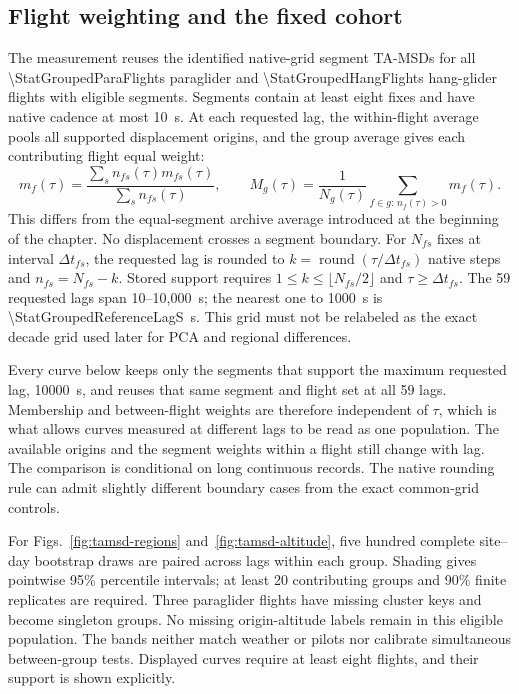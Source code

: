 \subsection{Flight weighting and the fixed cohort}

The measurement reuses the identified native-grid segment TA-MSDs for all
\num{\StatGroupedParaFlights} paraglider and \num{\StatGroupedHangFlights}
hang-glider flights with eligible segments. Segments contain at least eight fixes
and have native cadence at most \SI{10}{\second}. At each requested lag, the
within-flight average pools all supported displacement origins, and the group
average gives each contributing flight equal weight:
\begin{equation}
 m_f(\tau)=\frac{\sum_s n_{fs}(\tau)m_{fs}(\tau)}{\sum_s n_{fs}(\tau)},\qquad
 M_g(\tau)=\frac{1}{N_g(\tau)}\sum_{f\in g:\,n_f(\tau)>0}m_f(\tau).
 \label{eq:grouped-flight-tamsd}
\end{equation}
This differs from the equal-segment archive average introduced at the beginning
of the chapter. No displacement crosses a segment boundary. For $N_{fs}$ fixes
at interval $\Delta t_{fs}$, the requested lag is rounded to
$k=\operatorname{round}(\tau/\Delta t_{fs})$ native steps and
$n_{fs}=N_{fs}-k$. Stored support requires $1\le k\le\lfloor N_{fs}/2\rfloor$
and $\tau\ge\Delta t_{fs}$. The 59 requested lags span 10--10,000~s; the nearest
one to 1000~s is \SI{\StatGroupedReferenceLagS}{\second}. This grid must not be
relabeled as the exact decade grid used later for PCA and regional differences.

Every curve below keeps only the segments that support the maximum requested lag,
\SI{10000}{\second}, and reuses that same segment and flight set at all 59 lags.
Membership and between-flight weights are therefore independent of $\tau$, which is
what allows curves measured at different lags to be read as one population. The
available origins and the segment weights within a flight still change with lag.
The comparison is conditional on long continuous records. The native rounding rule
can admit slightly different boundary cases from the exact common-grid controls.

For Figs.~\ref{fig:tamsd-regions} and~\ref{fig:tamsd-altitude}, five hundred
complete site--day bootstrap draws are paired across lags within each group.
Shading gives pointwise 95\% percentile intervals; at least 20 contributing groups
and 90\% finite replicates are required. Three paraglider flights have missing cluster keys and
become singleton groups. No missing origin-altitude labels remain in this eligible
population. The bands neither match weather or pilots nor calibrate simultaneous
between-group tests. Displayed curves require at least eight flights, and their
support is shown explicitly.

